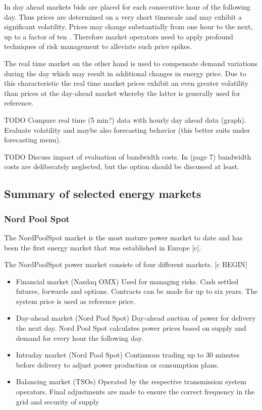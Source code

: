 In day ahead markets bids are placed for each consecutive hour of the following day. Thus prices are determined on a very short timescale and may exhibit a significant volatility. Prices may change substantially from one hour to the next, up to a factor of ten \cite{huisman2007hourly}. Therefore market operators need to apply profound techniques of risk management to alleviate such price spikes. 

The real time market on the other hand is used to compensate demand variations during the day which may result in additional changes in energy price. 
Due to this characteristic the real time market prices exhibit an even greater volatility than prices at the day-ahead market whereby the latter is generally used for reference. 

TODO Compare real time (5 min?) data with hourly day ahead data (graph). Evaluate volatility and maybe also forecasting behavior (this better suits under forecasting menu). 

TODO Discuss impact of evaluation of bandwidth costs. In \cite{rao2010minimizing} (page 7) bandwidth costs are deliberately neglected, but the option should be discussed at least. 


\subsection{Summary of selected energy markets}



\subsubsection{Nord Pool Spot}


The NordPoolSpot market is the most mature power market to date and has been the first energy market that was established in Europe [c]. 

The NordPoolSpot power market consists of four different markets. [c BEGIN]

\begin{itemize}[-]

\item Financial market (Nasdaq OMX)
Used for managing risks. Cash settled futures,
forwards and options. Contracts can be made for
up to six years. The system price is used as
reference price.

\item Day-ahead market (Nord Pool Spot)
Day-ahead auction of power for delivery the next
day. Nord Pool Spot calculates power prices
based on supply and demand for every hour the
following day.

\item Intraday market (Nord Pool Spot)
Continuous trading up to 30 minutes before
delivery to adjust power production or
consumption plans.

\item Balancing market (TSOs)
Operated by the respective transmission system
operators. Final adjustments are made to ensure
the correct frequency in the grid and security of
supply

\end{itemize}

